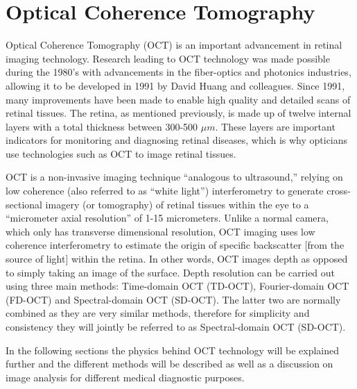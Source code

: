 \chapter{Optical Coherence Tomography}

\label{optical_coherence_tomography}

Optical Coherence Tomography (OCT) is an important advancement in retinal imaging
technology.  Research leading to OCT technology was made possible during the
1980’s with advancements in the fiber-optics and photonics industries, allowing it to be
developed in 1991 by David Huang and colleagues.\cite{mbib_1,mbib_2,mbib_3} 
Since 1991, many improvements have been made to enable high quality and detailed 
scans of retinal tissues.  The retina, as mentioned previously, is made up of twelve
internal layers with a total thickness between 300-500 $\mu m$.\cite{mbib_4}
These layers are important indicators for monitoring and diagnosing retinal diseases,
which is why opticians use technologies such as OCT to image retinal tissues.

OCT is a non-invasive imaging technique “analogous to ultrasound,” relying on low 
coherence (also referred to as “white light”) interferometry to generate cross-sectional
imagery (or tomography) of retinal tissues within the eye to a “micrometer axial
resolution” of 1-15 micrometers.\cite{mbib_5, mbib_6,mbib_2} Unlike a normal camera,
which only has transverse dimensional resolution, OCT imaging uses low coherence
interferometry to estimate the origin of specific backscatter [from the source of light]
within the retina.\cite{mbib_4}  In other words, OCT images depth as opposed to simply
taking an image of the surface.  Depth resolution can be carried out using three main
methods: Time-domain OCT (TD-OCT), Fourier-domain OCT (FD-OCT) and
Spectral-domain OCT (SD-OCT).  The latter two are normally combined as they are very
similar methods, therefore for simplicity and consistency they will jointly be referred to as
Spectral-domain OCT (SD-OCT).

In the following sections the physics behind OCT technology will be explained further
and the different methods will be described as well as a discussion on image analysis for
different medical diagnostic purposes.

